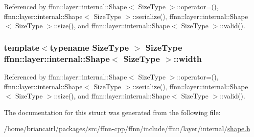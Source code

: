 Referenced by ffnn\-::layer\-::internal\-::\-Shape$<$ Size\-Type $>$\-::operator=(), ffnn\-::layer\-::internal\-::\-Shape$<$ Size\-Type $>$\-::serialize(), ffnn\-::layer\-::internal\-::\-Shape$<$ Size\-Type $>$\-::size(), and ffnn\-::layer\-::internal\-::\-Shape$<$ Size\-Type $>$\-::valid().

\hypertarget{structffnn_1_1layer_1_1internal_1_1_shape_ae8155a14b907ad1af92d108d5d77e12c}{
\subsubsection[{width}]{\setlength{\rightskip}{0pt plus 5cm}template$<$typename Size\-Type $>$ Size\-Type {\bf ffnn\-::layer\-::internal\-::\-Shape}$<$ Size\-Type $>$\-::width}}\label{structffnn_1_1layer_1_1internal_1_1_shape_ae8155a14b907ad1af92d108d5d77e12c}


Referenced by ffnn\-::layer\-::internal\-::\-Shape$<$ Size\-Type $>$\-::operator=(), ffnn\-::layer\-::internal\-::\-Shape$<$ Size\-Type $>$\-::serialize(), ffnn\-::layer\-::internal\-::\-Shape$<$ Size\-Type $>$\-::size(), and ffnn\-::layer\-::internal\-::\-Shape$<$ Size\-Type $>$\-::valid().



The documentation for this struct was generated from the following file\-:\begin{DoxyCompactItemize}
\item 
/home/briancairl/packages/src/ffnn-\/cpp/ffnn/include/ffnn/layer/internal/\hyperlink{shape_8h}{shape.\-h}\end{DoxyCompactItemize}
